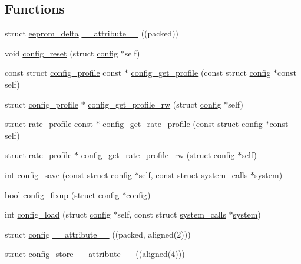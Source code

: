 \subsection*{Functions}
\begin{DoxyCompactItemize}
\item 
struct \hyperlink{structeeprom__delta}{eeprom\+\_\+delta} \hyperlink{group__config_ga25ae095baa2f7f76e117754a937e6cfa}{\+\_\+\+\_\+attribute\+\_\+\+\_\+} ((packed))
\item 
void \hyperlink{group__config_ga4b70e19635bc68e4d7ca8cab5646c833}{config\+\_\+reset} (struct \hyperlink{structconfig}{config} $\ast$self)
\item 
const struct \hyperlink{structconfig__profile}{config\+\_\+profile} const $\ast$ \hyperlink{group__config_ga547d1cb3ff0bbd0bb7381c73155ca8dd}{config\+\_\+get\+\_\+profile} (const struct \hyperlink{structconfig}{config} $\ast$const self)
\item 
struct \hyperlink{structconfig__profile}{config\+\_\+profile} $\ast$ \hyperlink{group__config_gad1e2009e01a92da1990ead7bd87c5476}{config\+\_\+get\+\_\+profile\+\_\+rw} (struct \hyperlink{structconfig}{config} $\ast$self)
\item 
struct \hyperlink{structrate__profile}{rate\+\_\+profile} const $\ast$ \hyperlink{group__config_gab2653104e4f0b8fcd39c0449401212d2}{config\+\_\+get\+\_\+rate\+\_\+profile} (const struct \hyperlink{structconfig}{config} $\ast$const self)
\item 
struct \hyperlink{structrate__profile}{rate\+\_\+profile} $\ast$ \hyperlink{group__config_gac3170633e7100e518a3174d3ac162c2a}{config\+\_\+get\+\_\+rate\+\_\+profile\+\_\+rw} (struct \hyperlink{structconfig}{config} $\ast$self)
\item 
int \hyperlink{group__config_ga6cb2bfd6f8116779ec2925cf3f1de774}{config\+\_\+save} (const struct \hyperlink{structconfig}{config} $\ast$self, const struct \hyperlink{structsystem__calls}{system\+\_\+calls} $\ast$\hyperlink{config_8h_a2c2c170dddadaff6ffd4467b45986b25}{system})
\item 
bool \hyperlink{group__config_ga73a0dc0f70f79138f7e6517cadb77adf}{config\+\_\+fixup} (struct \hyperlink{structconfig}{config} $\ast$\hyperlink{structconfig}{config})
\item 
int \hyperlink{group__config_ga033bfd111bc778cad1e84b836e7feb01}{config\+\_\+load} (struct \hyperlink{structconfig}{config} $\ast$self, const struct \hyperlink{structsystem__calls}{system\+\_\+calls} $\ast$\hyperlink{config_8h_a2c2c170dddadaff6ffd4467b45986b25}{system})
\item 
struct \hyperlink{structconfig}{config} \hyperlink{group__config_gaa5c3786fbfff87abd7c63b1b374b279d}{\+\_\+\+\_\+attribute\+\_\+\+\_\+} ((packed, aligned(2)))
\item 
struct \hyperlink{structconfig__store}{config\+\_\+store} \hyperlink{group__config_ga3ea6d562b09ef92ab0a2969a76f09282}{\+\_\+\+\_\+attribute\+\_\+\+\_\+} ((aligned(4)))
\end{DoxyCompactItemize}
